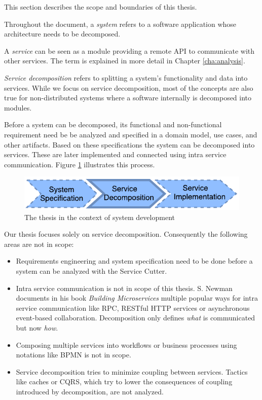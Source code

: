 This section describes the scope and boundaries of this thesis. 

Throughout the document, a \textit{system} refers to a software application whose architecture needs to be decomposed.

A \textit{service} can be seen as a module providing a remote \gls{API} to communicate with other services. The term is explained in more detail in Chapter \ref{cha:analysis}.

\textit{Service decomposition} refers to splitting a system's functionality and data into services. While we focus on service decomposition, most of the concepts are also true for non-distributed systems where a software internally is decomposed into modules. 

Before a system can be decomposed, its functional and non-functional requirement need be be analyzed and specified in a domain model, use cases, and other artifacts. Based on these specifications the system can be decomposed into services. These are later implemented and connected using intra service communication. Figure \ref{fig:context} illustrates this process.

\begin{figure}[H]
	\begin{center}
		\includegraphics[scale=1.4]{diagrams/context.pdf}
	\end{center}
	\caption{The thesis in the context of system development}
	\label{fig:context}
\end{figure}

Our thesis focuses solely on service decomposition. Consequently the following areas are not in scope:

\begin{itemize}
	\item Requirements engineering and system specification need to be done before a system can be analyzed with the Service Cutter.
	\item Intra service communication is not in scope of this thesis. S. Newman documents in his book \textit{Building Microservices}\cite{newman2015building} multiple popular ways for intra service communication like \gls{RPC}, RESTful HTTP services or asynchronous event-based collaboration. Decomposition only defines \textit{what} is communicated but now \textit{how}. 
	\item Composing multiple services into workflows or business processes using notations like \gls{BPMN} is not in scope.
	\item Service decomposition tries to minimize coupling between services. Tactics like caches or \gls{CQRS}, which try to lower the consequences of coupling introduced by decomposition, are not analyzed. 
\end{itemize}


